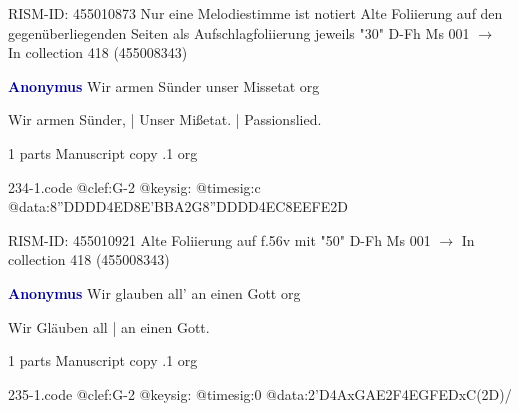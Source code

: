 \documentclass[twocolumn]{book}
\begin{document}
\newline RISM-ID: 455010873
\newline Nur eine Melodiestimme ist notiert
\newline Alte Foliierung auf den gegenüberliegenden Seiten als Aufschlagfoliierung jeweils "30"
\newline D-Fh  Ms 001
\newline $\rightarrow$ In collection 418 (455008343)

\newline \par \vspace{7pt} \textcolor{darkblue}{\textbf{Anonymus  }}
\newline Wir armen Sünder unser Missetat    
\newline org
\newline \begin{itshape}[f.56v, at left:] Wir armen Sünder, | Unser Mißetat. | Passionslied.\end{itshape} 
\newline \textcolor{darkblue}{}  1 parts  
\newline Manuscript copy
.1  org  
\begin{filecontents*}{234-1.code}
@clef:G-2
@keysig:
@timesig:c
@data:{8''DDDD}4ED{8E'BBA}2G{8''DDDD}4EC{8EEFE}2D
\end{filecontents*}
\newline
%

\newline RISM-ID: 455010921
\newline Alte Foliierung auf f.56v mit "50"
\newline D-Fh  Ms 001
\newline $\rightarrow$ In collection 418 (455008343)

\newline \par \vspace{7pt} \textcolor{darkblue}{\textbf{Anonymus  }}
\newline Wir glauben all' an einen Gott    
\newline org
\newline \begin{itshape}[f.18r, at left:] Wir Gläuben all | an einen Gott.\end{itshape} 
\newline \textcolor{darkblue}{}  1 parts  
\newline Manuscript copy
.1  org  
\begin{filecontents*}{235-1.code}
@clef:G-2
@keysig:
@timesig:0
@data:2'D4AxGAE2F4EGFEDxC(2D)/
\end{filecontents*}
\newline
%
\end{document}
